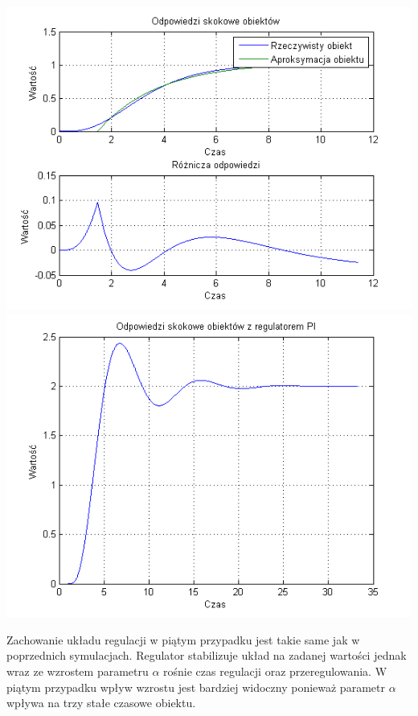 \documentclass[10pt,a4paper]{article}
\begin{document}
\begin{center}
\includegraphics[scale=1]{images/jeden/skrypt_133.png}\\
\includegraphics[scale=1]{images/jeden/skrypt_134.png}\\
\end{center}
\newpage
Zachowanie układu regulacji w piątym przypadku jest takie same jak w poprzednich symulacjach. Regulator stabilizuje układ na zadanej wartości jednak wraz ze wzrostem parametru $\alpha$ rośnie czas regulacji oraz przeregulowania. W piątym przypadku wpływ wzrostu jest bardziej widoczny ponieważ parametr $\alpha$ wpływa na trzy stałe czasowe obiektu.
\newpage
\end{document}
